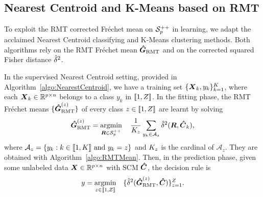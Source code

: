 \documentclass{article}
\theoremstyle{plain}
\theoremstyle{definition}
\theoremstyle{remark}
\begin{document}
\subsection{Nearest Centroid and K-Means based on RMT}
\label{sec:mean:learning}
To exploit the RMT corrected Fréchet mean on $\mathcal{S}^{++}_{p}$ in learning, we adapt the acclaimed Nearest Centroid classifying and K-Means clustering methods.
Both algorithms rely on the RMT Fréchet mean $\boldsymbol{\hat{G}}_{\textup{RMT}}$ and on the corrected squared Fisher distance $\hat{\delta}^2$.

In the supervised Nearest Centroid setting, provided in Algorithm~\ref{algo:NearestCentroid}, we have a training set $\{\boldsymbol{X}_k,y_k\}_{k=1}^{K}$, where each $\boldsymbol{X}_k\in\mathbb{R}^{p\times n}$ belongs to a class $y_k$ in $\llbracket 1,Z \rrbracket$.
%
In the fitting phase, the RMT Fréchet means $\{\boldsymbol{\hat{G}}_{\textup{RMT}}^{(z)}\}$ of every class $z\in\llbracket1,Z\rrbracket$ are learnt by solving
\begin{equation}
    \boldsymbol{\hat{G}}_{\textup{RMT}}^{(z)} = \operatorname*{argmin}_{\boldsymbol{R}\in\mathcal{S}^{++}_{p}} \quad \frac1{K_z}\sum_{y_k\in\mathcal{A}_z} \hat{\delta}^2(\boldsymbol{R},\boldsymbol{\hat{C}}_k),
\end{equation}
where $\mathcal{A}_z=\{y_k: k\in\llbracket1,K\rrbracket \textup{ and } y_k=z\}$ and $K_z$ is the cardinal of $\mathcal{A}_z$.
They are obtained with Algorithm~\ref{algo:RMTMean}.
%
Then, in the prediction phase, given some unlabeled data $\boldsymbol{X}\in\mathbb{R}^{p\times n}$ with SCM $\boldsymbol{\hat{C}}$, the decision rule is
\begin{equation}
    y = \operatorname*{argmin}_{z\in\llbracket1,Z\rrbracket} \quad \{\hat{\delta}^2(\boldsymbol{\hat{G}}_{\textup{RMT}}^{(z)},\boldsymbol{\hat{C}})\}_{z=1}^{Z}.
\label{eq:NearestCentroid_prediction}
\end{equation}
\end{document}
